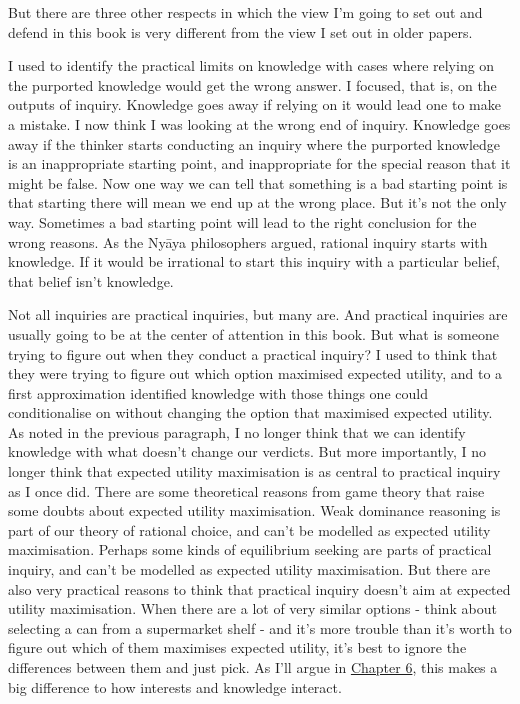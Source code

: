 \documentclass[
  12pt,
  letterpaper,
]{scrbook}
\begin{document}
But there are three other respects in which the view I'm going to set
out and defend in this book is very different from the view I set out in
older papers.

I used to identify the practical limits on knowledge with cases where
relying on the purported knowledge would get the wrong answer. I
focused, that is, on the outputs of inquiry. Knowledge goes away if
relying on it would lead one to make a mistake. I now think I was
looking at the wrong end of inquiry. Knowledge goes away if the thinker
starts conducting an inquiry where the purported knowledge is an
inappropriate starting point, and inappropriate for the special reason
that it might be false. Now one way we can tell that something is a bad
starting point is that starting there will mean we end up at the wrong
place. But it's not the only way. Sometimes a bad starting point will
lead to the right conclusion for the wrong reasons. As the Nyāya
philosophers argued, rational inquiry starts with knowledge. If it would
be irrational to start this inquiry with a particular belief, that
belief isn't knowledge.

Not all inquiries are practical inquiries, but many are. And practical
inquiries are usually going to be at the center of attention in this
book. But what is someone trying to figure out when they conduct a
practical inquiry? I used to think that they were trying to figure out
which option maximised expected utility, and to a first approximation
identified knowledge with those things one could conditionalise on
without changing the option that maximised expected utility. As noted in
the previous paragraph, I no longer think that we can identify knowledge
with what doesn't change our verdicts. But more importantly, I no longer
think that expected utility maximisation is as central to practical
inquiry as I once did. There are some theoretical reasons from game
theory that raise some doubts about expected utility maximisation. Weak
dominance reasoning is part of our theory of rational choice, and can't
be modelled as expected utility maximisation. Perhaps some kinds of
equilibrium seeking are parts of practical inquiry, and can't be
modelled as expected utility maximisation. But there are also very
practical reasons to think that practical inquiry doesn't aim at
expected utility maximisation. When there are a lot of very similar
options - think about selecting a can from a supermarket shelf - and
it's more trouble than it's worth to figure out which of them maximises
expected utility, it's best to ignore the differences between them and
just pick. As I'll argue in \hyperref[sec-ties]{Chapter 6}, this makes a
big difference to how interests and knowledge interact.
\end{document}
